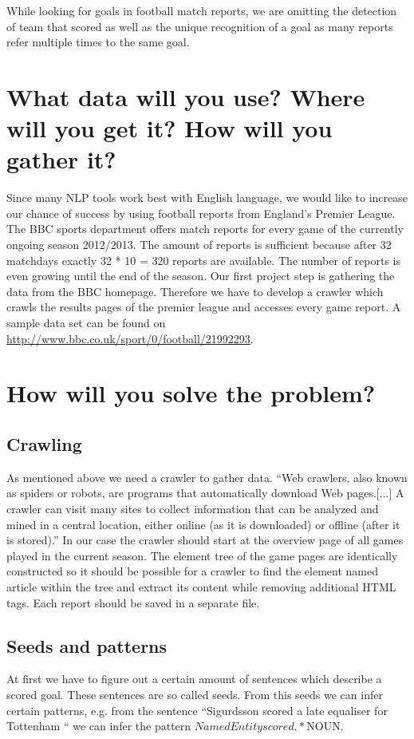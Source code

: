 \documentclass[11pt,titlepage,oneside,openany]{book}
\begin{document}
While looking for goals in football match reports, we are omitting the detection of team that scored as well as the unique recognition of a goal as many reports refer multiple times to the same goal.

\section{What data will you use? Where will you get it? How will you gather it?}

Since many NLP tools work best with English language, we would like to increase our chance of success by using football reports from England’s Premier League. The BBC sports department offers match reports for every game of the currently ongoing season 2012/2013. The amount of reports is sufficient because after 32 matchdays exactly 32 * 10 = 320 reports are available. The number of reports is even growing until the end of the season. Our first project step is gathering the data from the BBC homepage. Therefore we have to develop a crawler which crawls the results pages of the premier league and accesses every game report. A sample data set can be found on \href{http://www.bbc.co.uk/sport/0/football/21992293}{http://www.bbc.co.uk/sport/0/football/21992293}.		
			
\section{How will you solve the problem?}
\subsection{Crawling}
As mentioned above we need a crawler to gather data. ``Web crawlers, also known as spiders or robots, are programs that automatically download Web pages.[...] A crawler can visit many sites to collect information that can be analyzed and mined in a central location, either online (as it is downloaded) or offline (after it is stored).'' \citep[p.311]{Liu2007} In our case the crawler should start at the overview page of all games played in the current season. The element tree of the game pages are identically constructed so it should be possible for a crawler to find the element named article within the tree and extract its content while removing additional HTML tags. Each report should be saved in a separate file. 

\subsection{Seeds and patterns}
At first we have to figure out a certain amount of sentences which describe a scored goal. These sentences are so called seeds. 
From this seeds we can infer certain patterns, e.g. from the sentence “Sigurdsson scored a late equaliser for Tottenham “ we can infer the pattern $NamedEntity scored .* $NOUN. 
\end{document}
